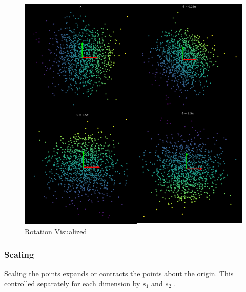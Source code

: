\begin{figure}[h!]
\begin{center}
\includegraphics{labs/01/images/Rotation.png}
\end{center} 
\caption{Rotation Visualized}
\label{fig:mon}
\end{figure}


\subsubsection{Scaling}
Scaling the points expands or contracts the points about the origin. 
This controlled separately for each dimension by \(s_1\) and \(s_2\) .

